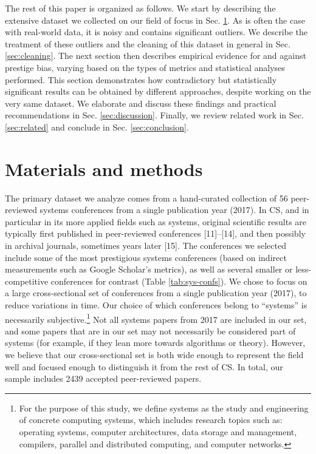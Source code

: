 \documentclass[12pt]{article}
\begin{document}
The rest of this paper is organized as follows.
We start by describing the extensive dataset we collected on our field of focus in Sec. \ref{sec:data}.
As is often the case with real-world data, it is noisy and contains significant outliers.
We describe the treatment of these outliers and the cleaning of this dataset in general in Sec. \ref{sec:cleaning}.
The next section then describes empirical evidence for and against prestige bias, varying based on the types of metrics and statistical analyses performed.
This section demonstrates how contradictory but statistically significant results can be obtained by different approaches, despite working on the very same dataset.
We elaborate and discuss these findings and practical recommendations in Sec. \ref{sec:discussion}.
Finally, we review related work in Sec. \ref{sec:related} and conclude in Sec. \ref{sec:conclusion}.

\hypertarget{sec:data}{%
\section{Materials and methods}\label{sec:data}}

The primary dataset we analyze comes from a hand-curated collection of 56 peer-reviewed systems conferences from a single publication year (2017).
In CS, and in particular in its more applied fields such as systems, original scientific results are typically first published in peer-reviewed conferences {[}11{]}--{[}14{]}, and then possibly in archival journals, sometimes years later {[}15{]}.
The conferences we selected include some of the most prestigious systems conferences (based on indirect measurements such as Google Scholar's metrics), as well as several smaller or less-competitive conferences for contrast (Table \ref{tab:sys-confs}).
We chose to focus on a large cross-sectional set of conferences from a single publication year (2017), to reduce variations in time.
Our choice of which conferences belong to ``systems'' is necessarily subjective.\footnote{For the purpose of this study, we define systems as the study and engineering of concrete computing systems, which includes research topics such as: operating systems, computer architectures, data storage and management, compilers, parallel and distributed computing, and computer networks.}
Not all systems papers from 2017 are included in our set, and some papers that are in our set may not necessarily be considered part of systems (for example, if they lean more towards algorithms or theory).
However, we believe that our cross-sectional set is both wide enough to represent the field well and focused enough to distinguish it from the rest of CS.
In total, our sample includes 2439 accepted peer-reviewed papers.
\end{document}
